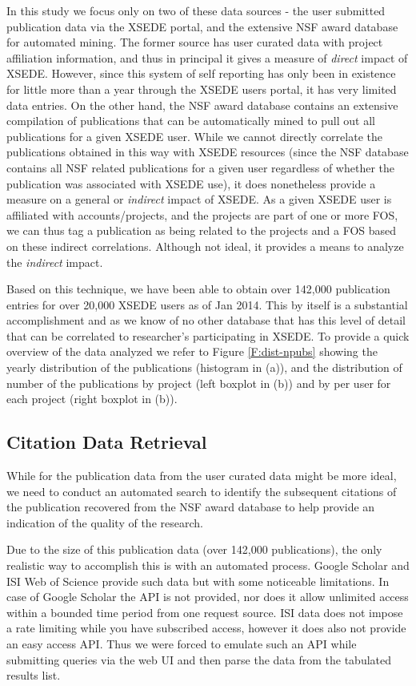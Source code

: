 \documentclass{tex/sig-alternate}
\begin{document}
In this study we focus only on two of these data sources - the user submitted publication data via the XSEDE portal, and the extensive NSF award database for automated mining. The former source has user curated data with project affiliation information, and thus in principal it gives a measure of \emph{direct} impact of XSEDE. However, since this system of self reporting has only been in existence for little more than a year through the XSEDE users portal, it has very limited data entries.  On the other hand, the NSF award database contains an extensive compilation of publications that can be automatically mined to pull out all publications for a given XSEDE user.   While we cannot directly correlate the publications obtained in this way with XSEDE resources (since the NSF database contains all NSF related publications for a given user regardless of whether the publication was associated with XSEDE use), it does nonetheless provide a measure on a general or \emph{indirect} impact of XSEDE.   As a given XSEDE user is affiliated with accounts/projects, and the projects are part of one or more FOS, we can thus tag a publication as being related to the projects and a FOS based on these indirect correlations. Although not ideal, it provides a means to analyze the \emph{indirect} impact. 
 
Based on this technique, we have been able to obtain over 142,000 publication entries for over 20,000 XSEDE users as of Jan 2014.  This by itself is a substantial accomplishment and as we know of no other database that has this level of detail that can be correlated to researcher's participating in XSEDE. To provide a quick overview of the data analyzed we refer to Figure \ref{F:dist-npubs} showing the yearly distribution of the publications (histogram in (a)), and the distribution of number of the publications by project (left boxplot in (b)) and by per user for each project (right boxplot in (b)). 
 
\subsection{Citation Data Retrieval} 
 
While for the publication data from the user curated data might be more ideal, we need to conduct an automated search to identify the subsequent citations of the publication recovered from the NSF award database to help provide an indication of the quality of the research. 

Due to the size of this publication data (over 142,000 publications), the only realistic way to accomplish this is with an automated process. Google Scholar and ISI Web of Science provide such data but with some noticeable limitations. In case of Google Scholar the API is not provided, nor does it allow unlimited access within a bounded time period from one request source. ISI data does not impose a rate limiting while you have subscribed access, however it does also not provide an easy access API. Thus we were forced to emulate such an API while submitting queries via the web UI and then parse the data from the tabulated results list. 
 
\end{document}
